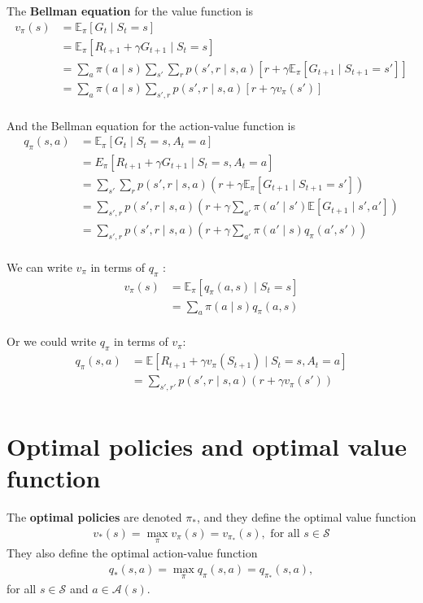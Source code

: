 \documentclass[a4paper,11pt,reqno]{amsart}
\begin{document}
The \textbf{Bellman equation} for the value function is
\begin{align}
v_\pi (s) &= \mathbb{E}_\pi \left[ G_t \mid S_t = s \right]  \\
&= \mathbb{E}_\pi \left[ R_{t + 1} + \gamma G_{t + 1} \mid S_t = s \right]  \\
&= \sum_{a} \pi (a \mid s) \sum_{s'} \sum_{r} p(s', r \mid s, a) \left[ r + \gamma \mathbb{E}_\pi \left[ G_{t + 1} \mid S_{t + 1} = s' \right]  \right]  \\
&= \sum_{a} \pi (a \mid s) \sum_{s', r} p(s', r \mid s, a) \left[ r + \gamma v_\pi (s') \right]  \\
\end{align}

And the Bellman equation for the action-value function is
\begin{align}
q_{\pi }(s, a) &= \mathbb{E}_\pi \left[ G_t \mid S_t =s, A_t = a \right]  \\
&= E_\pi \left[ R_{t+1} + \gamma G_{t+1} \mid S_t = s, A_t = a \right]  \\
&= \sum_{s'} \sum_{r} p(s', r\mid s, a)\left( r + \gamma \mathbb{E}_\pi \left[ G_{t+1} \mid S_{t+1} = s' \right] \right)   \\
&= \sum_{s', r}p(s', r \mid s, a)\left( r + \gamma \sum_{a'}\pi(a' \mid s') \mathbb{E}\left[ G_{t+1}\mid s', a' \right] \right)    \\
&= \sum_{s', r}p(s', r \mid s, a)\left( r + \gamma \sum_{a'} \pi (a'\mid s) q_{\pi }(a', s') \right)  \\
\end{align}

We can write $v_\pi$ in terms of $q_\pi $ :
\begin{align}
    v_\pi(s) &= \mathbb{E}_\pi \left[ q_{\pi }(a, s) \mid S_t = s \right] \\
        &= \sum_{a} \pi (a\mid s) q_{\pi }(a,s) \\
\end{align}

Or we could write $q_\pi $ in terms of $v_\pi$:
\begin{align}
    q_\pi(s, a) &= \mathbb{E}\left[ R_{t+1} + \gamma v_\pi (S_{t+1}) \mid S_t = s, A_t = a \right] \\
        &= \sum_{s', r'} p(s', r \mid s, a)(r + \gamma v_\pi (s')) \\
\end{align}


\section*{Optimal policies and optimal value function}
The \textbf{optimal policies} are denoted $\pi _*$, and they define the optimal value function
\begin{align}
    v_{*}(s) = \max_\pi v_\pi (s) = v_{\pi_* }(s), \text{ for all }s \in \mathcal{S}
\end{align}
They also define the optimal action-value function
\begin{align}
    q_{*}(s, a) = \max_\pi q_\pi (s, a) = q_{\pi_* }(s, a),
\end{align}
for all $s \in \mathcal{S}$ and $a \in \mathcal{A}(s)$.
\end{document}

